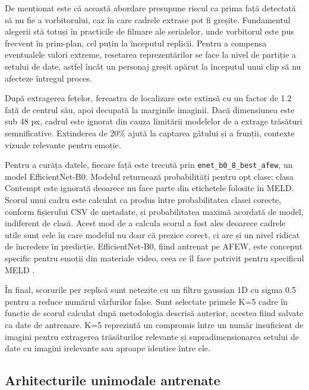 \documentclass[12pt, a4paper]{article}
\begin{document}
De menționat este că această abordare presupune riscul ca prima față detectată să nu fie a vorbitorului, caz în care cadrele extrase pot fi greșite. Fundamentul alegerii stă totuși în practicile de filmare ale serialelor, unde vorbitorul este pus frecvent în prim-plan, cel puțin la începutul replicii. Pentru a compensa eventualele valori extreme, resetarea reprezentărilor se face la nivel de partiție a setului de date, astfel încât un personaj greșit apărut la începutul unui clip să nu afecteze întregul proces.

După extragerea fețelor, fereastra de localizare este extinsă cu un factor de 1.2 față de centrul său, apoi decupată la marginile imaginii. Dacă dimensiunea este sub 48 px, cadrul este ignorat din cauza limitării modelelor de a extrage trăsături semnificative. Extinderea de 20\% ajută la captarea gâtului și a frunții, contexte vizuale relevante pentru emoție.

Pentru a curăța datele, fiecare față este trecută prin \texttt{enet\_b0\_8\_best\_afew}\cite{tan2019efficientnet,savchenko2022hsemotion}, un model EfficientNet-B0. Modelul returnează probabilități pentru opt clase; clasa Contempt este ignorată deoarece nu face parte din etichetele folosite în MELD. Scorul unui cadru este calculat ca produs între probabilitatea clasei corecte, conform fișierului CSV de metadate, și probabilitatea maximă acordată de model, indiferent de clasă. Acest mod de a calcula scorul a fost ales deoarece cadrele utile sunt cele în care modelul nu doar că prezice corect, ci are și un nivel ridicat de încredere în predicție. EfficientNet-B0, fiind antrenat pe AFEW, este conceput specific pentru emoții din materiale video, ceea ce îl face potrivit pentru specificul MELD \cite{dhall2012collecting,savchenko2022hsemotion}.

În final, scorurile per replică sunt netezite cu un filtru gaussian 1D cu sigma 0.5 pentru a reduce numărul vârfurilor false. Sunt selectate primele K=5 cadre în funcție de scorul calculat după metodologia descrisă anterior, acestea fiind salvate ca date de antrenare. K=5 reprezintă un compromis între un număr insuficient de imagini pentru extragerea trăsăturilor relevante și supradimensionarea setului de date cu imagini irelevante sau aproape identice între ele.

\subsection{Arhitecturile unimodale antrenate}
\end{document}
